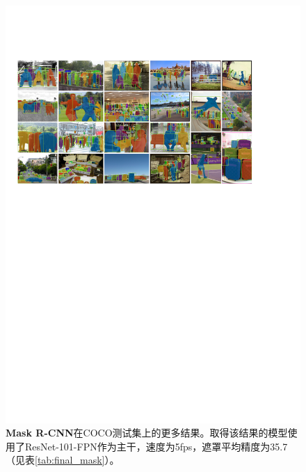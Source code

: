 \begin{figure}[t]
\centering
\includegraphics[width=1.0\linewidth]{figures/mask_rcnn/results_more}
\caption{\textbf{Mask R-CNN}在COCO测试集上的更多结果。取得该结果的模型使用了ResNet-101-FPN作为主干，速度为5fps，遮罩平均精度为35.7（见表\ref{tab:final_mask}）。}
\label{fig:results_more}
\end{figure}

